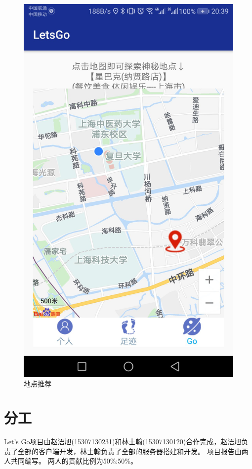\documentclass[UTF8]{article}
\begin{document}
\begin{figure}[H]
\begin{minipage}[t]{0.33\textwidth}
    \includegraphics[width=\textwidth]{images/demo_recommend.jpeg}
    \caption{地点推荐}
\end{minipage}
\end{figure}

\section{分工}
Let's Go项目由赵浯旭(15307130231)和林士翰(15307130120)合作完成，赵浯旭负责了全部的客户端开发，林士翰负责了全部的服务器搭建和开发。
项目报告由两人共同编写。
两人的贡献比例为50\%:50\%。
\end{document}
